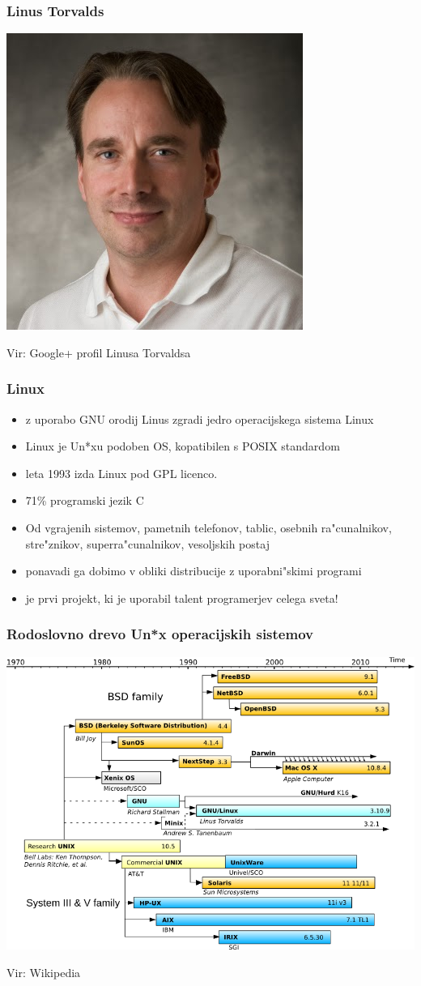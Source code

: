\documentclass{beamer}
\newcommand{\vir}[1]{\tiny{Vir: #1}}
\begin{document}
\begin{frame}
\frametitle{Linus Torvalds}
\begin{center}
\includegraphics[width=0.5\linewidth]{slike/Linus.jpg}
\end{center}
\vir{Google+ profil Linusa Torvaldsa}
\end{frame}
\begin{frame}
\frametitle{Linux}
\begin{itemize}
\item z uporabo GNU orodij Linus zgradi jedro operacijskega sistema Linux
\item Linux je Un*xu podoben OS, kopatibilen s POSIX standardom
\item leta 1993 izda Linux pod GPL licenco.
\item 71\% programski jezik C
\item Od vgrajenih sistemov, pametnih telefonov, tablic, osebnih ra"cunalnikov, stre"znikov, superra"cunalnikov, vesoljskih postaj
\item ponavadi ga dobimo v obliki distribucije z uporabni"skimi programi
\item je prvi projekt, ki je uporabil talent programerjev celega sveta!
\end{itemize}
\end{frame}

\begin{frame}
\frametitle{Rodoslovno drevo Un*x operacijskih sistemov}
\begin{center}
\includegraphics[width=0.75\linewidth]{slike/Unix_history.png}
\end{center}
\vir{Wikipedia}

\end{frame}
\end{document}
